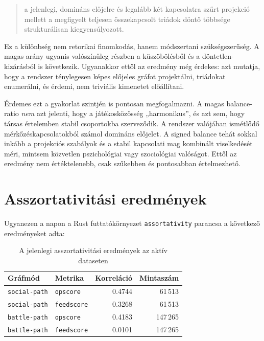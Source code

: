 \documentclass[a4paper,12pt]{report}
\begin{document}
\begin{quote}
a jelenlegi, domináns előjelre és legalább két kapcsolatra szűrt projekció mellett a megfigyelt teljesen összekapcsolt triádok döntő többsége strukturálisan kiegyensúlyozott.
\end{quote}

Ez a különbség nem retorikai finomkodás, hanem módszertani szükségszerűség. A magas arány ugyanis valószínűleg részben a küszöbölésből és a döntetlen-kizárásból is következik. Ugyanakkor ettől az eredmény még érdekes: azt mutatja, hogy a rendszer ténylegesen képes előjeles gráfot projektálni, triádokat enumerálni, és érdemi, nem triviális kimenetet előállítani.

Érdemes ezt a gyakorlat szintjén is pontosan megfogalmazni. A magas balance-ratio \emph{nem} azt jelenti, hogy a játékosközösség „harmonikus”, és azt sem, hogy társas értelemben stabil csoportokba szerveződik. A rendszer valójában ismétlődő mérkőzéskapcsolatokból számol domináns előjelet. A signed balance tehát sokkal inkább a projekciós szabályok és a stabil kapcsolati mag kombinált viselkedését méri, mintsem közvetlen pszichológiai vagy szociológiai valóságot. Ettől az eredmény nem értéktelenebb, csak szűkebben és pontosabban értelmezhető.

\section{Asszortativitási eredmények}

Ugyanezen a napon a Rust futtatókörnyezet \texttt{assortativity} parancsa a következő eredményeket adta:

\begin{table}[H]
\centering
\caption{A jelenlegi asszortativitási eredmények az aktív dataseten}
\begin{tabular}{llrr}
\toprule
\textbf{Gráfmód} & \textbf{Metrika} & \textbf{Korreláció} & \textbf{Mintaszám} \\
\midrule
\texttt{social-path} & \texttt{opscore} & 0.4744 & 61\,513 \\
\texttt{social-path} & \texttt{feedscore} & 0.3268 & 61\,513 \\
\texttt{battle-path} & \texttt{opscore} & 0.4183 & 147\,265 \\
\texttt{battle-path} & \texttt{feedscore} & 0.0101 & 147\,265 \\
\bottomrule
\end{tabular}
\end{table}
\end{document}
